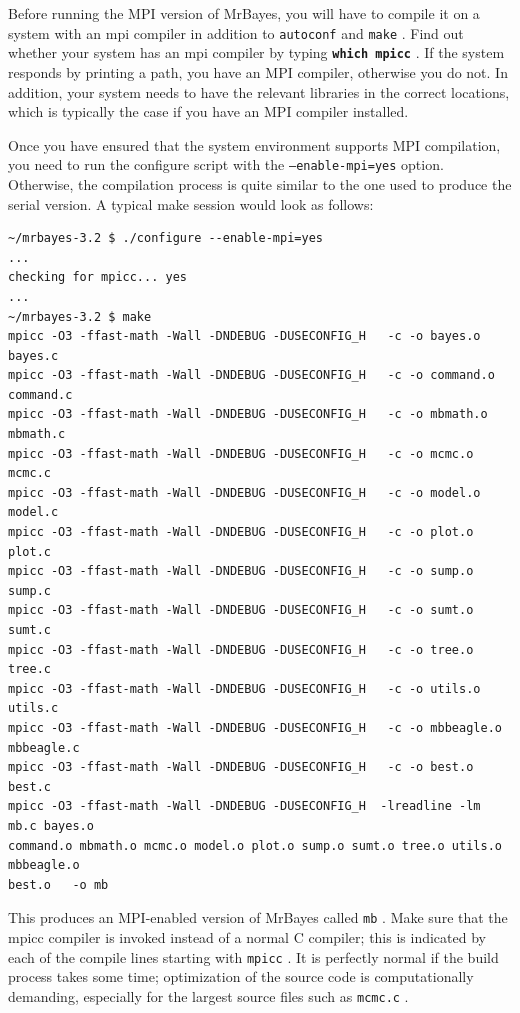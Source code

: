 \documentclass[12pt]{book}
\newcommand{\ttt}[1]{\texttt{#1} }
\newcommand{\tb}[1]{\texttt{\textbf{#1}} }
\begin{document}
Before running the MPI version of MrBayes, you will have to compile it on a system with an mpi compiler in addition
to \ttt{autoconf} and \ttt{make}. Find out whether your system has an mpi compiler by typing \tb{which mpicc}.
If the system responds by printing a path, you have an MPI compiler, otherwise you do not. In addition, your
system needs to have the relevant libraries in the correct locations, which is typically the case if you have an MPI
compiler installed.

Once you have ensured that the system environment supports MPI compilation, you need to run the configure
script with the \ttt{--enable-mpi=yes} option. Otherwise, the compilation process is quite similar to the one used
to produce the serial version. A typical make session would look as follows:

\begin{singlespacing}
\small
\begin{verbatim}
~/mrbayes-3.2 $ ./configure --enable-mpi=yes
...
checking for mpicc... yes
...
~/mrbayes-3.2 $ make
mpicc -O3 -ffast-math -Wall -DNDEBUG -DUSECONFIG_H   -c -o bayes.o bayes.c
mpicc -O3 -ffast-math -Wall -DNDEBUG -DUSECONFIG_H   -c -o command.o command.c
mpicc -O3 -ffast-math -Wall -DNDEBUG -DUSECONFIG_H   -c -o mbmath.o mbmath.c
mpicc -O3 -ffast-math -Wall -DNDEBUG -DUSECONFIG_H   -c -o mcmc.o mcmc.c
mpicc -O3 -ffast-math -Wall -DNDEBUG -DUSECONFIG_H   -c -o model.o model.c
mpicc -O3 -ffast-math -Wall -DNDEBUG -DUSECONFIG_H   -c -o plot.o plot.c
mpicc -O3 -ffast-math -Wall -DNDEBUG -DUSECONFIG_H   -c -o sump.o sump.c
mpicc -O3 -ffast-math -Wall -DNDEBUG -DUSECONFIG_H   -c -o sumt.o sumt.c
mpicc -O3 -ffast-math -Wall -DNDEBUG -DUSECONFIG_H   -c -o tree.o tree.c
mpicc -O3 -ffast-math -Wall -DNDEBUG -DUSECONFIG_H   -c -o utils.o utils.c
mpicc -O3 -ffast-math -Wall -DNDEBUG -DUSECONFIG_H   -c -o mbbeagle.o mbbeagle.c
mpicc -O3 -ffast-math -Wall -DNDEBUG -DUSECONFIG_H   -c -o best.o best.c
mpicc -O3 -ffast-math -Wall -DNDEBUG -DUSECONFIG_H  -lreadline -lm  mb.c bayes.o
command.o mbmath.o mcmc.o model.o plot.o sump.o sumt.o tree.o utils.o mbbeagle.o
best.o   -o mb
\end{verbatim}
\normalsize
\end{singlespacing}

This produces an MPI-enabled version of MrBayes called \ttt{mb}. Make sure that the mpicc compiler is 
invoked instead of a normal C compiler; this is indicated by each of the compile lines starting with
\ttt{mpicc}. It is perfectly normal if the build process takes some time; optimization of the source code
is computationally demanding, especially for the largest source files such as \ttt{mcmc.c}.
\end{document}
